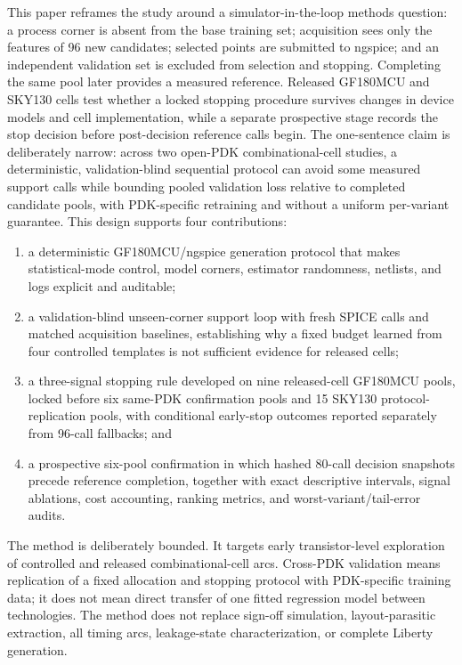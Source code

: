 \documentclass[preprint,12pt]{elsarticle}
\begin{document}
This paper reframes the study around a simulator-in-the-loop methods question: a process corner is absent from the base training set; acquisition sees only the features of 96 new candidates; selected points are submitted to ngspice; and an independent validation set is excluded from selection and stopping. Completing the same pool later provides a measured reference. Released GF180MCU and SKY130 cells test whether a locked stopping procedure survives changes in device models and cell implementation, while a separate prospective stage records the stop decision before post-decision reference calls begin. The one-sentence claim is deliberately narrow: across two open-PDK combinational-cell studies, a deterministic, validation-blind sequential protocol can avoid some measured support calls while bounding pooled validation loss relative to completed candidate pools, with PDK-specific retraining and without a uniform per-variant guarantee. This design supports four contributions:

\begin{enumerate}
\item a deterministic GF180MCU/ngspice generation protocol that makes statistical-mode control, model corners, estimator randomness, netlists, and logs explicit and auditable;
\item a validation-blind unseen-corner support loop with fresh SPICE calls and matched acquisition baselines, establishing why a fixed budget learned from four controlled templates is not sufficient evidence for released cells;
\item a three-signal stopping rule developed on nine released-cell GF180MCU pools, locked before six same-PDK confirmation pools and 15 SKY130 protocol-replication pools, with conditional early-stop outcomes reported separately from 96-call fallbacks; and
\item a prospective six-pool confirmation in which hashed 80-call decision snapshots precede reference completion, together with exact descriptive intervals, signal ablations, cost accounting, ranking metrics, and worst-variant/tail-error audits.
\end{enumerate}

The method is deliberately bounded. It targets early transistor-level exploration of controlled and released combinational-cell arcs. Cross-PDK validation means replication of a fixed allocation and stopping protocol with PDK-specific training data; it does not mean direct transfer of one fitted regression model between technologies. The method does not replace sign-off simulation, layout-parasitic extraction, all timing arcs, leakage-state characterization, or complete Liberty generation.
\end{document}

